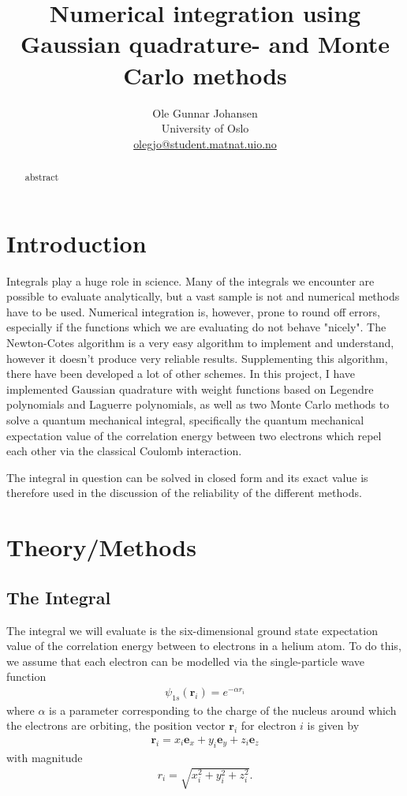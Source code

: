 \documentclass[twoside, 11pt]{article}
\title{\vspace{-15mm}\fontsize{16pt}{13pt}\selectfont\textbf{Numerical integration using Gaussian quadrature- and Monte Carlo methods}} %
\author{
\large
Ole Gunnar Johansen\\[0mm]%
\normalsize University of Oslo \\[0mm] %
\normalsize \href{mailto:olegjo@ulrik.uio.no}{olegjo@student.matnat.uio.no} %
\vspace{5mm}
}
\date{}
\begin{document}
\maketitle %
\thispagestyle{fancy} %


\begin{abstract}

\noindent
abstract
\end{abstract}


\section{Introduction}
	Integrals play a huge role in science. Many of the integrals we encounter are possible to evaluate analytically, but a vast sample is not and numerical methods have to be used. Numerical integration is, however, prone to round off errors, especially if the functions which we are evaluating do not behave "nicely". The Newton-Cotes algorithm is a very easy algorithm to implement and understand, however it doesn't produce very reliable results. Supplementing this algorithm, there have been developed a lot of other schemes. In this project, I have implemented Gaussian quadrature with weight functions based on Legendre polynomials and Laguerre polynomials, as well as two Monte Carlo methods to solve a quantum mechanical integral, specifically the quantum mechanical expectation value of the correlation energy between two electrons which repel each other via the classical Coulomb interaction. 
	
	The integral in question can be solved in closed form and its exact value is therefore used in the discussion of the reliability of the different methods.

\section{Theory/Methods}
	\subsection{The Integral}
		The integral we will evaluate is the six-dimensional ground state expectation value of the correlation energy between to electrons in a helium atom. To do this, we assume that each electron can be modelled via the single-particle wave function
		\begin{align}
			\psi_{1s} (\mathbf{r}_i) = e^{-\alpha r_i}
		\end{align}
		where $\alpha$ is a parameter corresponding to the charge of the nucleus around which the electrons are orbiting, the position vector $\mathbf{r}_i$ for electron $i$ is given by
		\begin{align}
			\mathbf{r}_i = x_i \mathbf{e}_x + y_i \mathbf{e}_y + z_i \mathbf{e}_z
		\end{align}
		with magnitude
		\begin{align}
			r_i = \sqrt{x_i^2 + y_i^2 + z_i^2}.
		\end{align}
		
\end{document}

